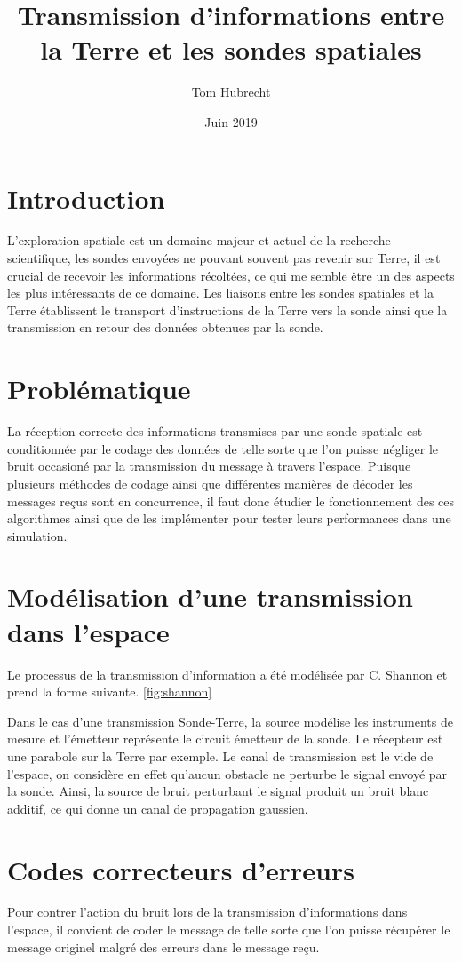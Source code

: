 \documentclass[12pt]{article}
\author{Tom Hubrecht}
\title{Transmission d'informations entre la Terre et les sondes spatiales}
\date{Juin 2019}
\begin{document}
\maketitle

\section{Introduction}
L'exploration spatiale est un domaine majeur et actuel de la recherche scientifique, les sondes envoyées ne pouvant souvent pas revenir sur Terre, il est crucial de recevoir les informations récoltées, ce qui me semble être un des aspects les plus intéressants de ce domaine. Les liaisons entre les sondes spatiales et la Terre établissent le transport d'instructions de la Terre vers la sonde ainsi que la transmission en retour des données obtenues par la sonde.


\section{Probl\'ematique}
La r\'eception correcte des informations transmises par une sonde spatiale est conditionn\'ee par le codage des donn\'ees de telle sorte que l'on puisse n\'egliger le bruit occasion\'e par la transmission du message \`a travers l'espace. Puisque plusieurs m\'ethodes de codage ainsi que diff\'erentes mani\`eres de d\'ecoder les messages re\c{c}us sont en concurrence, il faut donc \'etudier le fonctionnement des ces algorithmes ainsi que de les impl\'ementer pour tester leurs performances dans une simulation.


\section{Mod\'elisation d'une transmission dans l'espace}
Le processus de la transmission d'information a \'et\'e mod\'elis\'ee par C. Shannon et prend la forme suivante.
\ref{fig:shannon}


Dans le cas d'une transmission Sonde-Terre, la source mod\'elise les instruments de mesure et l'\'emetteur repr\'esente le circuit \'emetteur de la sonde. Le r\'ecepteur est une parabole sur la Terre par exemple. Le canal de transmission est le vide de l'espace, on consid\`ere en effet qu'aucun obstacle ne perturbe le signal envoy\'e par la sonde. Ainsi, la source de bruit perturbant le signal produit un bruit blanc additif, ce qui donne un canal de propagation gaussien.


\section{Codes correcteurs d'erreurs}
Pour contrer l'action du bruit lors de la transmission d'informations dans l'espace, il convient de coder le message de telle sorte que l'on puisse r\'ecup\'erer le message originel malgr\'e des erreurs dans le message re\c{c}u.
\end{document}
